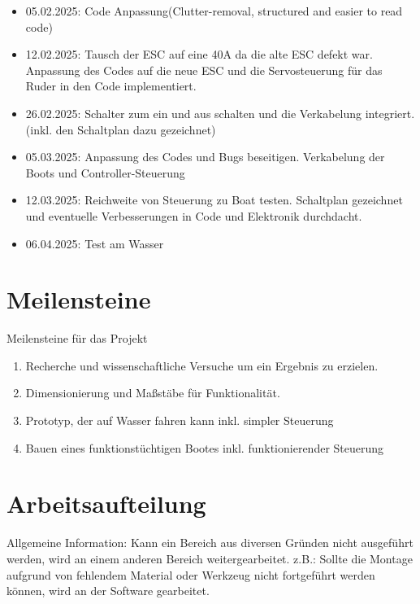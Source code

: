 \documentclass[a4paper,12pt]{article}
\begin{document}
\begin{itemize}
    \item 05.02.2025: Code Anpassung(Clutter-removal, structured and easier to read code)
    \item 12.02.2025: Tausch der ESC auf eine 40A da die alte ESC defekt war. Anpassung des Codes auf die neue ESC und die Servosteuerung für das Ruder in den Code implementiert.
    \item 26.02.2025: Schalter zum ein und aus schalten und die Verkabelung integriert. (inkl. den Schaltplan dazu gezeichnet) 
    \item 05.03.2025: Anpassung des Codes und Bugs beseitigen. Verkabelung der Boots und Controller-Steuerung
    \item 12.03.2025: Reichweite von Steuerung zu Boat testen. Schaltplan gezeichnet und eventuelle Verbesserungen in Code und Elektronik durchdacht. 
    \item 06.04.2025: Test am Wasser
\end{itemize}

\newpage



\section{Meilensteine}

Meilensteine für das Projekt

 \begin{enumerate}
     \item Recherche und wissenschaftliche Versuche um ein Ergebnis zu erzielen.
     \item Dimensionierung und Maßstäbe für Funktionalität.
     \item Prototyp, der auf Wasser fahren kann inkl. simpler Steuerung
     \item Bauen eines funktionstüchtigen Bootes inkl. funktionierender Steuerung
   
     
 \end{enumerate}

\section{Arbeitsaufteilung}

Allgemeine Information: Kann ein Bereich aus diversen Gründen nicht ausgeführt werden, wird an einem anderen Bereich weitergearbeitet. z.B.: Sollte die Montage aufgrund von fehlendem Material oder Werkzeug nicht fortgeführt werden können, wird an der Software gearbeitet.
\newline
\end{document}
